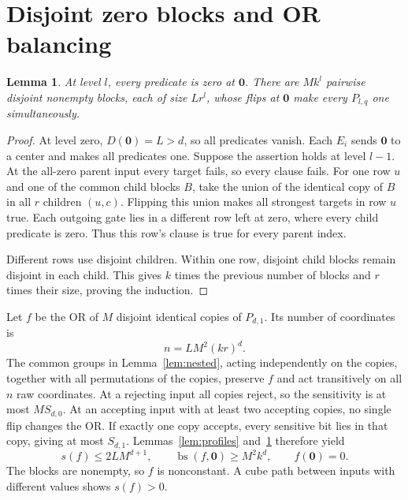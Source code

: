 \documentclass[11pt]{article}
\newtheorem{lemma}[theorem]{Lemma}
\theoremstyle{definition}
\DeclareMathOperator{\bs}{bs}
\newcommand{\zero}{\mathbf 0}
\begin{document}
\section{Disjoint zero blocks and OR balancing}\label{sec:blocks}
\begin{lemma}\label{lem:blocks}
At level $l$, every predicate is zero at $\zero$. There are $Mk^l$ pairwise disjoint nonempty blocks, each of size $Lr^l$, whose flips at $\zero$ make every $P_{l,q}$ one simultaneously.
\end{lemma}
\begin{proof}
At level zero, $D(\zero)=L>d$, so all predicates vanish. Each $E_i$ sends $\zero$ to a center and makes all predicates one. Suppose the assertion holds at level $l-1$. At the all-zero parent input every target fails, so every clause fails. For one row $u$ and one of the common child blocks $B$, take the union of the identical copy of $B$ in all $r$ children $(u,c)$. Flipping this union makes all strongest targets in row $u$ true. Each outgoing gate lies in a different row left at zero, where every child predicate is zero. Thus this row's clause is true for every parent index.

Different rows use disjoint children. Within one row, disjoint child blocks remain disjoint in each child. This gives $k$ times the previous number of blocks and $r$ times their size, proving the induction.
\end{proof}

Let $f$ be the OR of $M$ disjoint identical copies of $P_{d,1}$. Its number of coordinates is
\begin{equation}\label{eq:n}
 n=LM^2(kr)^d.
\end{equation}
The common groups in Lemma~\ref{lem:nested}, acting independently on the copies, together with all permutations of the copies, preserve $f$ and act transitively on all $n$ raw coordinates. At a rejecting input all copies reject, so the sensitivity is at most $MS_{d,0}$. At an accepting input with at least two accepting copies, no single flip changes the OR. If exactly one copy accepts, every sensitive bit lies in that copy, giving at most $S_{d,1}$. Lemmas~\ref{lem:profiles} and~\ref{lem:blocks} therefore yield
\begin{equation}\label{eq:seedbounds}
 s(f)\le2L M^{d+1},\qquad
 \bs(f,\zero)\ge M^2k^d,\qquad f(\zero)=0.
\end{equation}
The blocks are nonempty, so $f$ is nonconstant. A cube path between inputs with different values shows $s(f)>0$.
\end{document}
